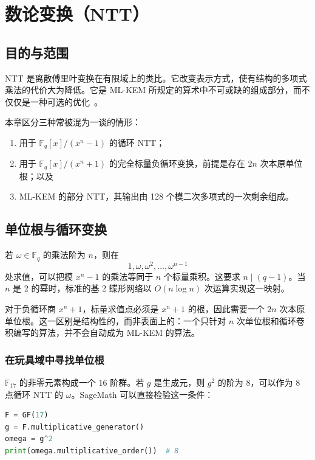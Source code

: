 \chapter{数论变换（NTT）}
\label{ch:ntt}

\section{目的与范围}

NTT 是离散傅里叶变换在有限域上的类比。它改变表示方式，使有结构的多项式乘法的代价大为降低。它是 ML-KEM 所规定的算术中不可或缺的组成部分，而不仅仅是一种可选的优化~\cite{fips203}。

本章区分三种常被混为一谈的情形：
\begin{enumerate}
  \item 用于 $\mathbb{F}_q[x]/(x^n-1)$ 的循环 NTT；
  \item 用于 $\mathbb{F}_q[x]/(x^n+1)$ 的完全标量负循环变换，前提是存在 $2n$ 次本原单位根；以及
  \item ML-KEM 的部分 NTT，其输出由 128 个模二次多项式的一次剩余组成。
\end{enumerate}

\section{单位根与循环变换}

若 $\omega\in\mathbb{F}_q$ 的乘法阶为 $n$，则在
\[
1,\omega,\omega^2,\ldots,\omega^{n-1}
\]
处求值，可以把模 $x^n-1$ 的乘法等同于 $n$ 个标量乘积。这要求 $n\mid(q-1)$。当 $n$ 是 2 的幂时，标准的基 2 蝶形网络以 $O(n\log n)$ 次运算实现这一映射。

对于负循环商 $x^n+1$，标量求值点必须是 $x^n+1$ 的根，因此需要一个 $2n$ 次本原单位根。这一区别是结构性的，而非表面上的：一个只针对 $n$ 次单位根和循环卷积编写的算法，并不会自动成为 ML-KEM 的算法。

\subsection{在玩具域中寻找单位根}

$\mathbb{F}_{17}$ 的非零元素构成一个 $16$ 阶群。若 $g$ 是生成元，则 $g^2$ 的阶为 $8$，可以作为 8 点循环 NTT 的 $\omega$。SageMath 可以直接检验这一条件：

\begin{lstlisting}[language=Python]
F = GF(17)
g = F.multiplicative_generator()
omega = g^2
print(omega.multiplicative_order())  # 8
\end{lstlisting}

